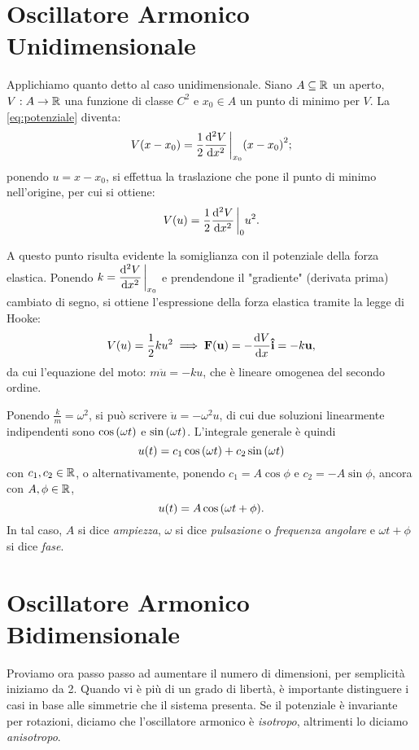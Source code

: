\section{Oscillatore Armonico Unidimensionale}
    Applichiamo quanto detto al caso unidimensionale. Siano $A\subseteq\mathbb{R}$ un aperto, $V:A\rightarrow\mathbb{R}$ una funzione di classe $C^2$ e $x_0\in A$ un punto di minimo per $V$. La \eqref{eq:potenziale} diventa: $$V(x-x_0)=\frac{1}{2}\dv[2]{V}{x}\eval_{x_0}\qty(x-x_0)^2;$$ ponendo $u=x-x_0$, si effettua la traslazione che pone il punto di minimo nell'origine, per cui si ottiene: $$V(u)=\frac{1}{2}\dv[2]{V}{x}\eval_{0}u^2.$$ \par A questo punto risulta evidente la somiglianza con il potenziale della forza elastica. Ponendo $\displaystyle k=\dv[2]{V}{x}\eval_{x_0}$ e prendendone il "gradiente" (derivata prima) cambiato di segno, si ottiene l'espressione della forza elastica tramite la legge di Hooke: $$V\qty(u)=\frac{1}{2}ku^2 \implies \vb{F\qty(\vb{u})}=-\dv{V}{x}\vu{i}=-k\vb{u},$$ da cui l'equazione del moto: $m\ddot{u}=-ku$, che \`e lineare omogenea del secondo ordine. \par Ponendo $\frac{k}{m}=\omega^2$, si pu\`o scrivere $\ddot{u}=-\omega^2u$, di cui due soluzioni linearmente indipendenti sono $\cos\qty(\omega t)$ e $\sin\qty(\omega t)$. L'integrale generale \`e quindi $$u\qty(t)=c_1\cos\qty(\omega t)+c_2\sin\qty(\omega t)$$ con $c_1,c_2\in\mathbb{R}$, o alternativamente, ponendo $c_1=A\cos\phi$ e $c_2=-A\sin\phi$, ancora con $A,\phi\in\mathbb{R}$, $$u\qty(t)=A\cos\qty(\omega t+\phi).$$ In tal caso, $A$ si dice \emph{ampiezza}, $\omega$ si dice \emph{pulsazione} o \emph{frequenza angolare} e $\omega t+\phi$ si dice \emph{fase}.
\section{Oscillatore Armonico Bidimensionale}
    Proviamo ora passo passo ad aumentare il numero di dimensioni, per semplicit\`a iniziamo da 2. Quando vi \`e pi\`u di un grado di libert\`a, \`e importante distinguere i casi in base alle simmetrie che il sistema presenta. Se il potenziale \`e invariante per rotazioni, diciamo che l'oscillatore armonico \`e \emph{isotropo}, altrimenti lo diciamo \emph{anisotropo}.
